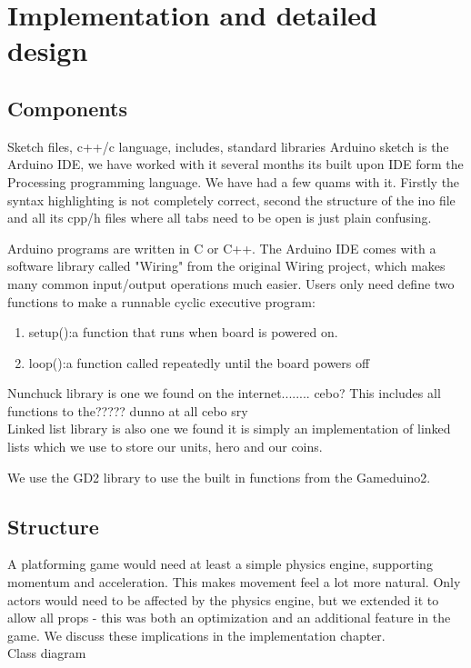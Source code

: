 \chapter{Implementation and detailed design} %

\section{Components}
Sketch files, c++/c language, includes, standard libraries
Arduino sketch is the Arduino IDE, we have worked with it several months its built upon IDE form the Processing programming language. We have had a few quams with it. Firstly the syntax highlighting is not completely correct, second the structure of the ino file and all its cpp/h files where all tabs need to be open is just plain confusing.

Arduino programs are written in C or C++. The Arduino IDE comes with a software library called "Wiring" from the original Wiring project, which makes many common input/output operations much easier. Users only need define two functions to make a runnable cyclic executive program: 
\begin{enumerate}
\item setup():a function that runs when board is powered on.
\item loop():a function called repeatedly until the board powers off
\end{enumerate}

Nunchuck library is one we found on the internet........ cebo? This includes all functions to the????? dunno at all cebo sry\\
Linked list library is also one we found it is simply an implementation of linked lists which we use to store our units, hero and our coins.

We use the GD2 library to use the built in functions from the Gameduino2.

\section{Structure} %
A platforming game would need at least a simple physics engine, supporting momentum and acceleration. This makes movement feel a lot more natural. Only actors would need to be affected by the physics engine, but we extended it to allow all props - this was both an optimization and an additional feature in the game. We discuss these implications in the implementation chapter.\\
Class diagram

